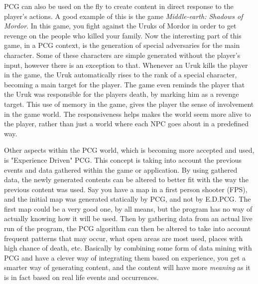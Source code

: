 PCG can also be used on the fly to create content in direct response to the player's actions. A good example of this is the game \textit{Middle-earth: Shadows of Mordor}\cite{game:shadowMordor}. In this game, you fight against the Uruks of Mordor in order to get revenge on the people who killed your family. 
Now the interesting part of this game, in a PCG context, is the generation of special adversaries for the main character. Some of these characters are simple generated without the player's input, however there is an exception to that. Whenever an Uruk kills the player in the game, the Uruk automatically rises to the rank of a special character, becoming a main target for the player. The game even reminds the player that the Uruk was responsible for the players death, by marking him as a revenge target.
This use of memory in the game, gives the player the sense of involvement in the game world. The responsiveness helps makes the world seem more alive to the player, rather than just a world where each NPC goes about in a predefined way.

Other aspects within the PCG world, which is becoming more accepted and used, is "Experience Driven" PCG\cite{art:exppcg}. This concept is taking into account the previous events and data gathered within the game or application. By using gathered data, the newly generated contents can be altered to better fit with the way the previous content was used. Say you have a map in a first person shooter (FPS), and the initial map was generated statically by PCG, and not by E.D.PCG. The first map could be a very good one, by all means, but the program has no way of actually knowing how it will be used. Then by gathering data from an actual live run of the program, the PCG algorithm can then be altered to take into account frequent patterns that may occur, what open areas are most used, places with high chance of death, etc. Basically by combining some form of data mining with PCG and have a clever way of integrating them based on experience, you get a smarter way of generating content, and the content will have more \textit{meaning} as it is in fact based on real life events and occurrences.


